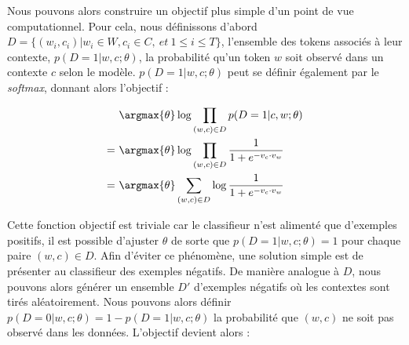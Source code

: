 \documentclass[12pt,a4paper,times,twoside,openright]{report}
\begin{document}
Nous pouvons alors construire un objectif plus simple d'un point de vue computationnel. Pour cela, nous définissons d'abord $D=\{(w_{i},c_{i})| w_{i} \in W, c_{i} \in C,\ et\ 1 \leq i \leq T\}$, l'ensemble des tokens associés à leur contexte, $p(D = 1|w, c;\theta)$, la probabilité qu'un token $w$ soit observé dans un contexte $c$ selon le modèle. $p(D = 1|w, c;\theta)$ peut se définir également par le \emph{softmax}, donnant alors l'objectif :

\begin{equation}\label{eq:negative-sampling-naive}
\begin{aligned}
  &\ \argmax{\theta} \log \prod_{(w,c) \in D} p(D=1|c,w;\theta) \\
= &\ \argmax{\theta} \log \prod_{(w,c) \in D} \frac{1}{1+e^{-v_c \cdot v_{w}}} \\
= &\ \argmax{\theta} \sum_{(w,c) \in D} \log \frac{1}{1+e^{-v_c \cdot v_{w}}} \\
\end{aligned}
\end{equation}

Cette fonction objectif est triviale car le classifieur n'est alimenté que d'exemples positifs, il est possible d'ajuster $\theta$ de sorte que $p(D = 1|w, c;\theta)=1$ pour chaque paire $(w,c) \in D$. Afin d'éviter ce phénomène, une solution simple est de présenter au classifieur des exemples négatifs. De manière analogue à $D$, nous pouvons alors générer un ensemble $D'$ d'exemples négatifs où les contextes sont tirés aléatoirement. Nous pouvons alors définir $p(D=0|w,c;\theta) = 1 - p(D=1|w,c;\theta)$ la probabilité que $(w,c)$ ne soit pas observé dans les données. L'objectif devient alors :
\end{document}
